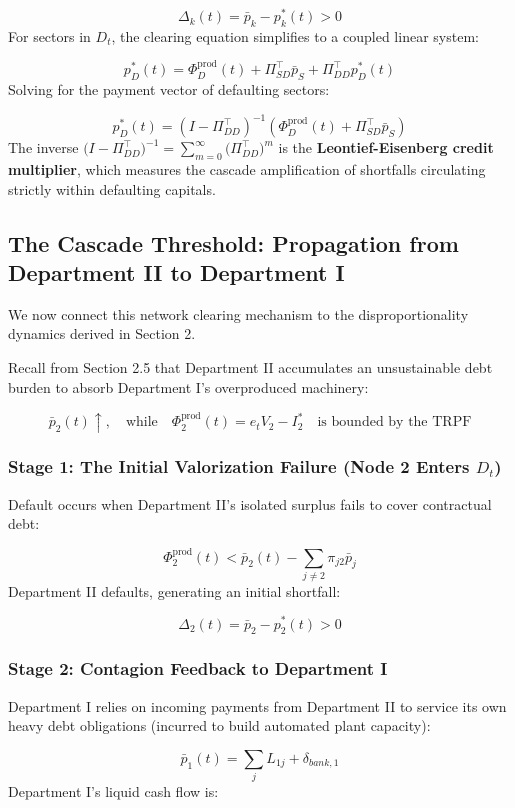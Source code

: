 \documentclass[11pt,letterpaper]{report}
\begin{document}
\[
{\Delta }_{k}(t)={\bar{p}}_{k}-{p}_{k}^{*}(t)>0
\]
For sectors in ${D}_{t}$, the clearing equation simplifies to a coupled linear system:

\[
{p}_{D}^{*}(t)={\Phi }_{D}^{\mathrm{prod}}(t)+{\Pi }_{SD}^{\top }{\bar{p}}_{S}+{\Pi }_{DD}^{\top }{p}_{D}^{*}(t)
\]
Solving for the payment vector of defaulting sectors:

\[
{p}_{D}^{*}(t)={\left({I-{\Pi }_{DD}^{\top }}\right)}^{-1}\left({{\Phi }_{D}^{\mathrm{prod}}(t)+{\Pi }_{SD}^{\top }{\bar{p}}_{S}}\right)
\]
The inverse $(I-{\Pi }_{DD}^{\top }{)}^{-1}=\sum\limits_{m=0}^{\infty }({\Pi }_{DD}^{\top }{)}^{m}$ is the \textbf{Leontief-Eisenberg credit multiplier}, which measures the cascade amplification of shortfalls circulating strictly within defaulting capitals.

\subsection{The Cascade Threshold: Propagation from Department II to Department I}
We now connect this network clearing mechanism to the disproportionality dynamics derived in Section 2.

Recall from Section 2.5 that Department II accumulates an unsustainable debt burden to absorb Department I's overproduced machinery:

\[
{\bar{p}}_{2}(t)\uparrow ,\quad\text{while}\quad{\Phi }_{2}^{\mathrm{prod}}(t)={e}_{t}{V}_{2}-{I}_{2}^{*}\quad\text{is bounded by the TRPF}
\]
\subsubsection{Stage 1: The Initial Valorization Failure (Node 2 Enters ${D}_{t}$)}
Default occurs when Department II's isolated surplus fails to cover contractual debt:

\[
{\Phi }_{2}^{\mathrm{prod}}(t)<{\bar{p}}_{2}(t)-\sum_{j\ne 2}{\pi }_{j2}{\bar{p}}_{j}
\]
Department II defaults, generating an initial shortfall:

\[
{\Delta }_{2}(t)={\bar{p}}_{2}-{p}_{2}^{*}(t)>0
\]
\subsubsection{Stage 2: Contagion Feedback to Department I}
Department I relies on incoming payments from Department II to service its own heavy debt obligations (incurred to build automated plant capacity):

\[
{\bar{p}}_{1}(t)=\sum_{j}{L}_{1j}+{\delta }_{bank,1}
\]
Department I's liquid cash flow is:
\end{document}
